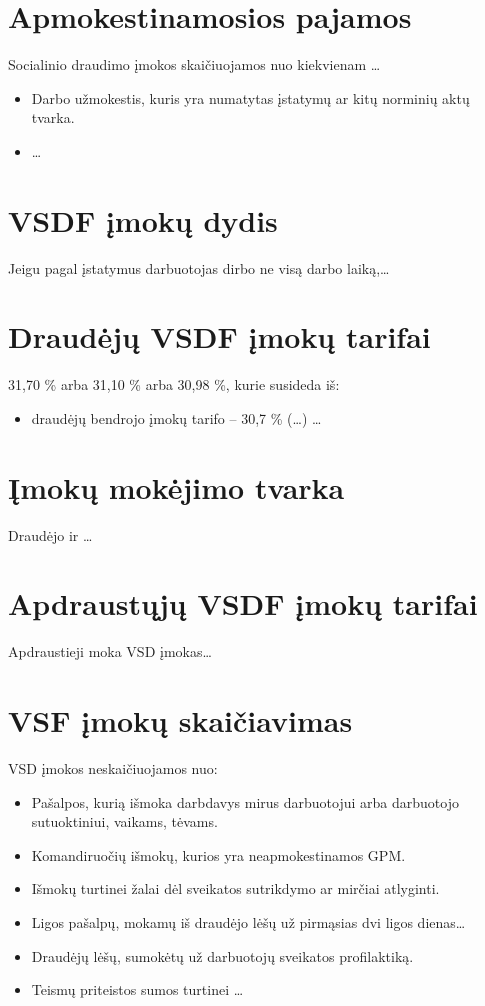 \section{Apmokestinamosios pajamos}

Socialinio draudimo įmokos skaičiuojamos nuo kiekvienam …

\begin{itemize}
  \item Darbo užmokestis, kuris yra numatytas įstatymų ar kitų norminių
    aktų tvarka.
  \item …
\end{itemize}

\section{VSDF įmokų dydis}

Jeigu pagal įstatymus darbuotojas dirbo ne visą darbo laiką,…

\section{Draudėjų VSDF įmokų tarifai}

31,70 \% arba 31,10 \% arba  30,98 \%, kurie susideda iš:
\begin{itemize}
  \item draudėjų bendrojo įmokų tarifo – 30,7 \% (…)
    …
\end{itemize}

\section{Įmokų mokėjimo tvarka}

Draudėjo ir …

\section{Apdraustųjų VSDF įmokų tarifai}

Apdraustieji moka VSD įmokas…

\section{VSF įmokų skaičiavimas}

VSD įmokos neskaičiuojamos nuo:
\begin{itemize}
  \item Pašalpos, kurią išmoka darbdavys mirus darbuotojui arba darbuotojo
    sutuoktiniui, vaikams, tėvams.
  \item Komandiruočių išmokų, kurios yra neapmokestinamos GPM.
  \item Išmokų turtinei žalai dėl sveikatos sutrikdymo ar mirčiai
    atlyginti.
  \item Ligos pašalpų, mokamų iš draudėjo lėšų už pirmąsias dvi
    ligos dienas…
  \item Draudėjų lėšų, sumokėtų už darbuotojų sveikatos profilaktiką.
  \item Teismų priteistos sumos turtinei …
\end{itemize}

